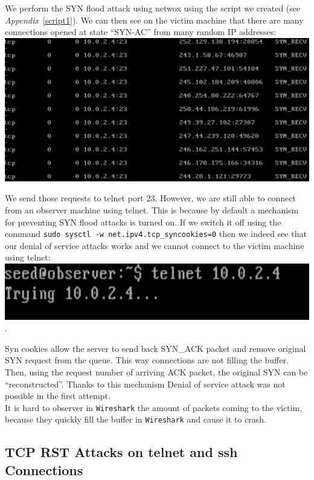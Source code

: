 \documentclass[12pt, a4paper]{article}
\begin{document}
We perform the SYN flood attack using netwox using the script we created (see \emph{Appendix}~\ref{script1}). We can then see on the victim machine that there are many connections opened at state ``SYN-AC'' from many random IP addresses:\\
\includegraphics[width=.95\textwidth]{gfx/syn-netstat.png}

We send those requests to telnet port 23. However, we are still able to connect from an observer machine using telnet. This is because by default a mechanism for preventing SYN flood attacks is turned on. If we switch it off using the command \texttt{sudo sysctl -w net.ipv4.tcp\_syncookies=0} then we indeed see that our denial of service attacks works and we cannot connect to the victim machine using telnet:\\

\includegraphics[width=.95\textwidth]{gfx/syn-telnet.png}.

Syn cookies allow the server to send back SYN\_ACK packet and remove original SYN request from the queue. This way connections are not filling the buffer. Then, using the request number of arriving ACK packet, the original SYN can be ``reconstructed''. Thanks to this mechanism Denial of service attack was not possible in the first attempt.\\

It is hard to observer in \texttt{Wireshark} the amount of packets coming to the victim, because they quickly fill the buffer in \texttt{Wireshark} and cause it to crash.

\subsection{TCP RST Attacks on telnet and ssh Connections}
\end{document}

